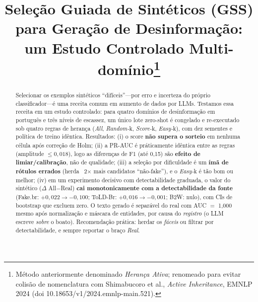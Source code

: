\documentclass[conference]{IEEEtran}
\begin{document}
\title{Sele\c{c}\~ao Guiada de Sint\'eticos (GSS) para Gera\c{c}\~ao de Desinforma\c{c}\~ao:\\um Estudo Controlado Multi-dom\'inio\thanks{M\'etodo anteriormente denominado \emph{Heran\c{c}a Ativa}; renomeado para evitar colis\~ao de nomenclatura com Shimabucoro et al., \emph{Active Inheritance}, EMNLP 2024 (doi 10.18653/v1/2024.emnlp-main.521).}}

\author{
}

\maketitle

\begin{abstract}
Selecionar os exemplos sint\'eticos ``dif\'iceis''---por erro e incerteza do pr\'oprio classificador---\'e uma receita comum em aumento de dados por LLMs. Testamos essa receita em um estudo controlado: para quatro dom\'inios de desinforma\c{c}\~ao em portugu\^es e tr\^es n\'iveis de escassez, um \'unico lote zero-shot \'e congelado e re-executado sob quatro regras de heran\c{c}a (\emph{All}, \emph{Random-}k, \emph{Score-}k, \emph{Easy-}k), com dez sementes e pol\'itica de treino id\^entica. Resultados: (i) o score \textbf{n\~ao supera o sorteio} em nenhuma c\'elula ap\'os corre\c{c}\~ao de Holm; (ii) a PR-AUC \'e pr\'aticamente id\^entica entre as regras (amplitude $\le 0{,}018$), logo as diferen\c{c}as de F1 (at\'e 0{,}15) s\~ao \textbf{efeito de limiar/calibra\c{c}\~ao}, n\~ao de qualidade; (iii) a sele\c{c}\~ao por dificuldade \'e um \textbf{\'im\~a de r\'otulos errados} (herda ~2$\times$ mais candidatos ``n\~ao-fake''), e o \emph{Easy-}k \'e t\~ao bom ou melhor; (iv) em um experimento decisivo com detectabilidade graduada, o valor do sint\'etico ($\Delta$ All$-$Real) \textbf{cai monotonicamente com a detectabilidade da fonte} (Fake.br: $+0{,}022\to-0{,}100$; ToLD-Br: $+0{,}016\to-0{,}001$; B2W: nulo), com CIs de bootstrap que excluem zero. O texto gerado \'e separ\'avel do real com AUC $=$ 1{,}000 mesmo ap\'os normaliza\c{c}\~ao e m\'ascara de entidades, por causa do \emph{registro} (o LLM escreve \emph{sobre} o boato). Recomenda\c{c}\~ao pr\'atica: herdar os \emph{f\'aceis} ou filtrar por detectabilidade, e sempre reportar o bra\c{c}o \emph{Real}.
\end{abstract}
\end{document}
